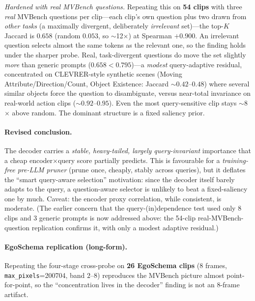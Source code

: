 \documentclass[11pt]{article}
\begin{document}
\emph{Hardened with real MVBench questions.} Repeating this on \textbf{54 clips} with
three \emph{real} MVBench questions per clip---each clip's own question plus two drawn
from \emph{other tasks} (a maximally divergent, deliberately \emph{irrelevant} set)---the
top-$K$ Jaccard is $\mathbf{0.658}$ (random $0.053$, so $\sim$12$\times$) at Spearman
$\mathbf{+0.900}$. An irrelevant question selects almost the same tokens as the relevant
one, so the finding holds under the sharper probe. Real, task-divergent questions do move
the set slightly \emph{more} than generic prompts ($0.658<0.795$)---a \emph{modest}
query-adaptive residual, concentrated on CLEVRER-style synthetic scenes (Moving
Attribute/Direction/Count, Object Existence: Jaccard $\sim0.42$--$0.48$) where several
similar objects force the question to disambiguate, versus near-total invariance on
real-world action clips ($\sim0.92$--$0.95$). Even the most query-sensitive clip stays
$\sim$8$\times$ above random. The dominant structure is a fixed saliency prior.

\paragraph{Revised conclusion.} The decoder carries a \emph{stable, heavy-tailed,
largely query-invariant} importance that a cheap encoder$\times$query score partially
predicts. This is favourable for a \emph{training-free pre-LLM pruner} (prune once,
cheaply, stably across queries), but it deflates the ``smart query-aware selection''
motivation: since the decoder itself barely adapts to the query, a question-aware
selector is unlikely to beat a fixed-saliency one by much. Caveat: the encoder proxy
correlation, while consistent, is moderate. (The earlier concern that the
query-(in)dependence test used only 8 clips and 3 generic prompts is now addressed above:
the 54-clip real-MVBench-question replication confirms it, with only a modest adaptive
residual.)

\paragraph{EgoSchema replication (long-form).} Repeating the four-stage cross-probe on
\textbf{26 EgoSchema clips} (8 frames, \texttt{max\_pixels}=200704, band $2$--$8$)
reproduces the MVBench picture almost point-for-point, so the ``concentration lives in the
decoder'' finding is not an 8-frame artifact.
\end{document}
